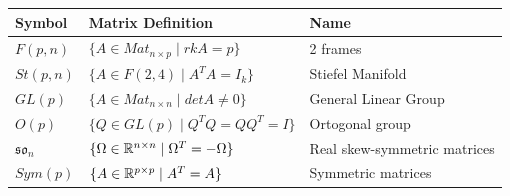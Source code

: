 \documentclass[11pt,a4paper]{report}
\begin{document}
\noindent\begin{tabularx}{\textwidth}{@{}XXX@{}}  \toprule
  Symbol & Matrix Definition & Name \\
  \toprule
  $F(p,n)$  & $\{A \in Mat_{n \times p}  \; | \; rkA = p  \} $ & 2 frames \\
  \toprule
  $St(p,n)$ & $ \{ A \in F(2,4) \; | \; A^T A = I_k \} $ & Stiefel Manifold \\
  \toprule
  $ GL(p)$ &  $ \{ A \in Mat_{n \times n} \; | \; det A \neq 0 \}$ & General Linear Group \\
  \toprule
  $ O(p)$ & $ \{ Q \in GL(p) \; | \; Q^T Q = Q Q^T = I \}$  & Ortogonal group \\
  \toprule
  $ \mathfrak{so}_n $ & $ \{ \Omega \in \mathbb{R}^{n \times n} \; | \; \Omega^T = - \Omega \} $ & Real skew-symmetric matrices \\
  \toprule
  $ Sym(p) $ & $ \{ A \in \mathbb{R}^{p \times p} \; | \; A^T = A \} $ & Symmetric matrices \\
\end{tabularx}\offinterlineskip

 


 
\end{document}
